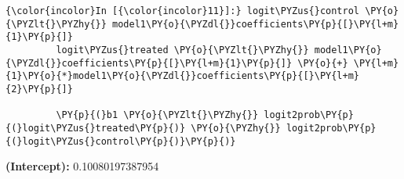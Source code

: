 
    \begin{Verbatim}[commandchars=\\\{\}]
{\color{incolor}In [{\color{incolor}11}]:} logit\PYZus{}control \PY{o}{\PYZlt{}\PYZhy{}} model1\PY{o}{\PYZdl{}}coefficients\PY{p}{[}\PY{l+m}{1}\PY{p}{]}
         logit\PYZus{}treated \PY{o}{\PYZlt{}\PYZhy{}} model1\PY{o}{\PYZdl{}}coefficients\PY{p}{[}\PY{l+m}{1}\PY{p}{]} \PY{o}{+} \PY{l+m}{1}\PY{o}{*}model1\PY{o}{\PYZdl{}}coefficients\PY{p}{[}\PY{l+m}{2}\PY{p}{]}
         
         \PY{p}{(}b1 \PY{o}{\PYZlt{}\PYZhy{}} logit2prob\PY{p}{(}logit\PYZus{}treated\PY{p}{)} \PY{o}{\PYZhy{}} logit2prob\PY{p}{(}logit\PYZus{}control\PY{p}{)}\PY{p}{)}
\end{Verbatim}


    \textbf{(Intercept):} 0.10080197387954

